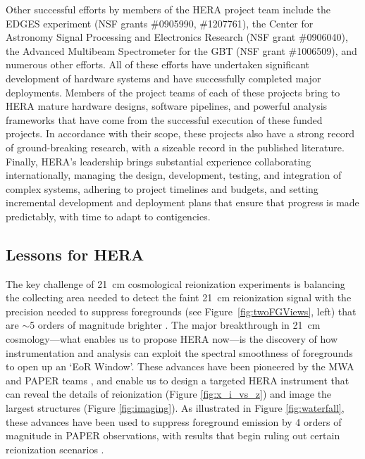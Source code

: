 \documentclass[preprint]{aastex}
\begin{document}
Other successful efforts by members of the HERA project team include the EDGES experiment (NSF grants \#0905990, \#1207761),
the Center for Astronomy Signal Processing and Electronics Research (NSF grant \#0906040), the Advanced Multibeam
Spectrometer for the GBT (NSF grant \#1006509), and numerous other efforts.
All of these efforts have undertaken significant development of hardware systems and have 
successfully completed major deployments.  Members of the project teams of each of these projects
bring to HERA mature hardware designs, software pipelines, and powerful analysis frameworks that
have come from the successful execution of these funded projects.  
In accordance with their scope,
these projects also have a strong record of ground-breaking research, with a sizeable record in the published literature.
Finally, HERA's leadership brings substantial experience
collaborating internationally, managing the design, development, testing, and integration of complex systems,
adhering to project timelines and budgets, and setting incremental development and deployment plans that
ensure that progress is made predictably, with time to adapt to contigencies.


\subsection{Lessons for HERA}

The key challenge of 21~cm cosmological reionization experiments is 
balancing the collecting area needed to detect the faint 21~cm reionization signal
with the precision needed to suppress
foregrounds (see Figure~\ref{fig:twoFGViews}, left) that are $\sim$5 orders of magnitude brighter \cite{deolivieracosta_et_al2008}.
The major breakthrough in 21~cm cosmology---what enables us to propose HERA now---is 
the discovery of how 
instrumentation and analysis can exploit the 
spectral smoothness of foregrounds
to open up an `EoR Window'.  These advances have been pioneered by the MWA and PAPER teams \citep{morales_et_al2012,parsons_et_al2012b,vedantham_2012,Datta_2010,hazelton_et_al2013,pober_et_al2013,parsons_et_al2013,dillon_et_al2013b}, and enable us to design a targeted HERA instrument that can reveal the details of reionization (Figure \ref{fig:x_i_vs_z}) and image the largest structures (Figure \ref{fig:imaging}).
As illustrated in Figure \ref{fig:waterfall}, these advances have been used to suppress foreground emission by 4
orders of magnitude in PAPER observations,
with results that begin ruling out certain reionization scenarios
\citep{parsons_et_al2013}.
\end{document}
